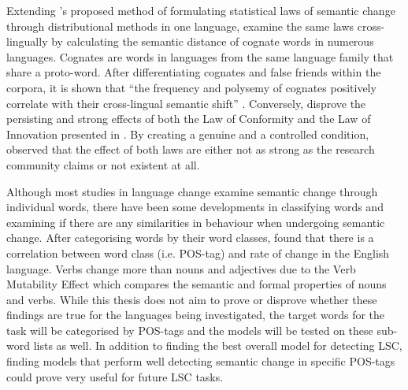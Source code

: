 Extending \citet{hamilton-etal-2016-diachronic}’s proposed method of formulating statistical laws of semantic change through distributional methods in one language, \citet{uban-etal-2019-studying} examine the same laws cross-lingually by calculating the semantic distance of cognate words in numerous languages. Cognates are words in languages from the same language family that share a proto-word. After differentiating cognates and false friends within the corpora, it is shown that “the frequency and polysemy of cognates positively correlate with their cross-lingual semantic shift” \citep{uban-etal-2019-studying}. Conversely, \citet{dubossarsky-etal-2017-outta} disprove the persisting and strong effects of both the Law of Conformity and the Law of Innovation presented in \citet{hamilton-etal-2016-diachronic}. By creating a genuine and a controlled condition, \citet{dubossarsky-etal-2017-outta} observed that the effect of both laws are either not as strong as the research community claims or not existent at all.



Although most studies in language change examine semantic change through individual words, there have been some developments in classifying words and examining if there are any similarities in behaviour when undergoing semantic change. After categorising words by their word classes, \citet{dubossarsky2018semantic} found that there is a correlation between word class (i.e. POS-tag) and rate of change in the English language. Verbs change more than nouns and adjectives due to the Verb Mutability Effect which compares the semantic and formal properties of nouns and verbs. While this thesis does not aim to prove or disprove whether these findings are true for the languages being investigated, the target words for the task will be categorised by POS-tags and the models will be tested on these sub-word lists as well. In addition to finding the best overall model for detecting LSC, finding models that perform well detecting semantic change in specific POS-tags could prove very useful for future LSC tasks. 


